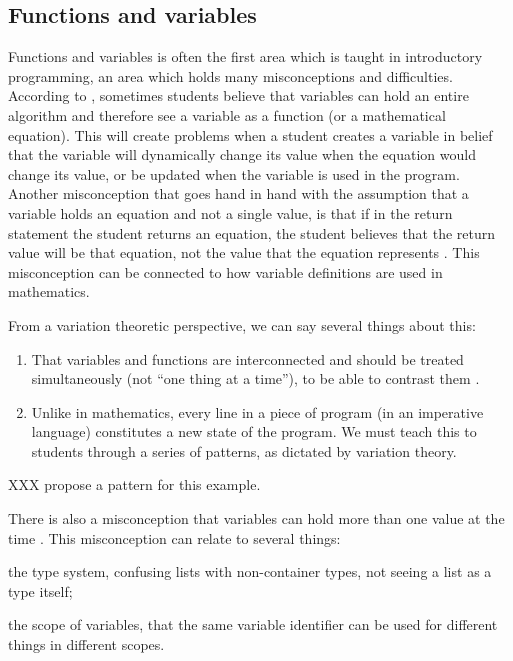 \subsection{Functions and variables}

Functions and variables is often the first area which is taught in 
introductory programming, an area which holds many misconceptions and 
difficulties. According to \textcite{
Kohn2017VariableEvaluation,Plass2015Variables,Doukakis2007}, 
sometimes students believe that variables can hold an entire algorithm and 
therefore see a variable as a function (or a mathematical equation). This will 
create problems when a student creates a variable in belief that the variable 
will dynamically change its value when the equation would change its value, 
or be updated
when the variable is used in the program. Another misconception that goes 
hand in hand with the assumption that a 
variable holds an equation and not a single value, is that if in the return 
statement the student returns an equation, the student believes that the 
return 
value will be that equation, not the value that the equation represents 
\parencite{Kohn2017VariableEvaluation}.
This misconception can be 
connected to how variable definitions are used in mathematics. 

From a variation theoretic perspective, we can say several things about this:
\begin{enumerate}
  \item That variables and functions are interconnected and should be treated 
    simultaneously (not \enquote{one thing at a time}), to be able to contrast 
    them \parencite[\cf][Ch~6, pp~167--168]{NCOL}.
  \item Unlike in mathematics, every line in a piece of program (in an 
    imperative language) constitutes a new state of the program.
    We must teach this to students through a series of patterns, as dictated 
by 
    variation theory.
\end{enumerate}

XXX propose a pattern for this example.

There is also a misconception that variables can hold more than one value at 
the time \parencite{Doukakis2007}.
This misconception can relate to several things:
\begin{enumerate*}
  \item the type system, confusing lists with non-container types, not seeing 
a 
    list as a type itself;
  \item the scope of variables, that the same variable identifier can be used 
    for different things in different scopes.
\end{enumerate*}

